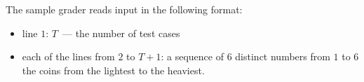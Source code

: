 The sample grader reads input in the following format:
\begin{itemize}
\item line $1$: $T$~--- the number of test cases
\item each of the lines from $2$ to $T + 1$: a sequence of $6$ distinct numbers from $1$ to $6$ the coins from the lightest to the heaviest.
\end{itemize}
